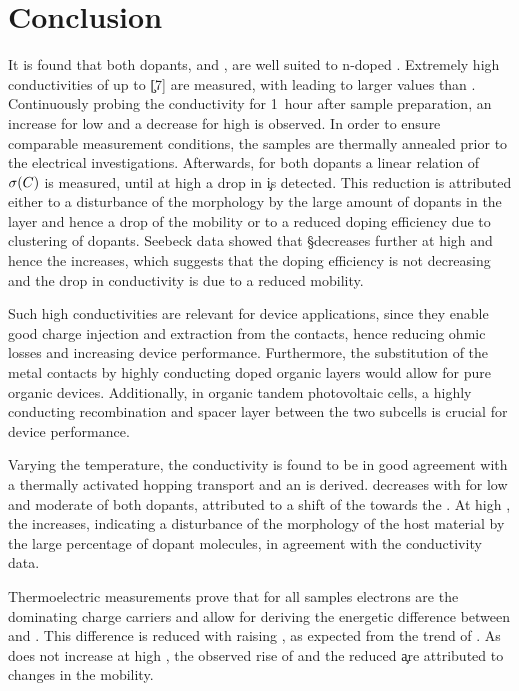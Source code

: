 \section{Conclusion}\label{sec:ResPdConclusion}
It is found that both dopants, \CrPd and \WPd, are well suited to n-doped \CS. Extremely high conductivities of up to \c[7] are measured, with \CrPd leading to larger values than \WPd. Continuously probing the conductivity for 1~hour after sample preparation, an increase for low and a decrease for high \CLongs is observed. In order to ensure comparable measurement conditions, the samples are thermally annealed prior to the electrical investigations. Afterwards, for both dopants a linear relation of $\c(\C)$ is measured, until at high \C a drop in \c is detected. This reduction is attributed either to a disturbance of the morphology by the large amount of dopants in the layer and hence a drop of the mobility or to a reduced doping efficiency due to clustering of dopants. Seebeck data showed that \S decreases further at high \C and hence the \neLong increases, which suggests that the doping efficiency is not decreasing and the drop in conductivity is due to a reduced mobility.

Such high conductivities are relevant for device applications, since they enable good charge injection and extraction from the contacts, hence reducing ohmic losses and increasing device performance\cite{Blochwitz1998}.
Furthermore, the substitution of the metal contacts by highly conducting doped organic layers would allow for pure organic devices\cite{Schubert2013}. Additionally, in organic tandem photovoltaic cells, a highly conducting recombination and spacer layer between the two subcells is crucial for device performance\cite{Riede2011,Meiss2011}.

Varying the temperature, the conductivity is found to be in good agreement with a thermally activated hopping transport and an \EactLong \Eact is derived. \Eact decreases with \C for low and moderate \C of both dopants, attributed to a shift of the \EfLong towards the \EtLong. At high \C, the \Eact increases, indicating a disturbance of the morphology of the host material by the large percentage of dopant molecules, in agreement with the conductivity data.

Thermoelectric measurements prove that for all samples electrons are the dominating charge carriers and allow for deriving the energetic difference \Es between \EfLong and \EtLong. This difference is reduced with raising \CLong, as expected from the trend of \Eact. As \Es does not increase at high \C, the observed rise of \Eact and the reduced \c are attributed to changes in the mobility.

